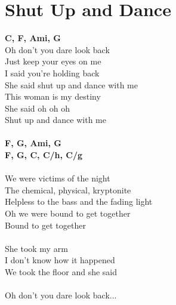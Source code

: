 \section{Shut Up and Dance}
\footnotesize\textbf{C, F, Ami, G}\\
\normalsize
Oh don't you dare look back\\
Just keep your eyes on me\\
I said you're holding back\\
She said shut up and dance with me\\
This woman is my destiny\\
She said oh oh oh\\
Shut up and dance with me\\
\\
\footnotesize\textbf{F, G, Ami, G}\\
\footnotesize\textbf{F, G, C, C/h, C/g}\\
\normalsize
\\
We were victims of the night\\
The chemical, physical, kryptonite\\
Helpless to the bass and the fading light\\
Oh we were bound to get together\\
Bound to get together\\
\\
She took my arm\\
I don't know how it happened\\
We took the floor and she said\\
\\
Oh don't you dare look back...\\
